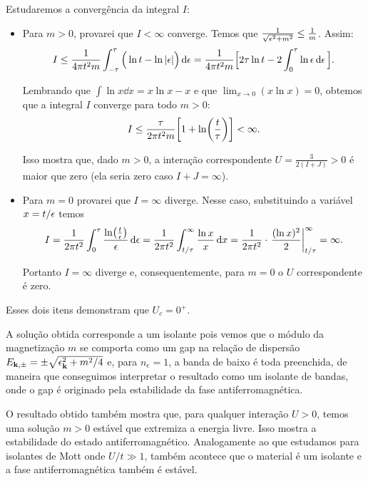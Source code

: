 \documentclass[a4paper,10pt]{article}
\begin{document}
\n

Estudaremos a convergência da integral $I$:
\begin{itemize}
\item Para $m > 0$, provarei que $I < \infty$ converge. Temos que $\frac{1}{\sqrt{\epsilon^2+m^2}} \leq \frac{1}{m}$. Assim:
$$
I \leq \frac{1}{4\pi t^2 m} \int_{-\tau}^{\tau} \Big( \ln t - \ln\abs{\epsilon} \Big) \dd{\epsilon} =
\frac{1}{4\pi t^2 m} \Big[ 2\tau \ln t - 2 \int_{0}^{\tau} \ln\epsilon \dd{\epsilon} \Big] .
$$

Lembrando que $\int \ln x \dd{x} = x \ln x - x$ e que $\displaystyle{\lim_{x\to 0} (x \ln x) = 0}$, obtemos que a integral $I$ converge para todo $m > 0$:
$$
I \leq \frac{\tau}{2\pi t^2 m} \qty[1 + \ln(\frac{t}{\tau})] < \infty.
$$

Isso mostra que, dado $m > 0$, a interação correspondente $U = \frac{3}{2(I+J)} > 0$ é maior que zero (ela seria zero caso $I + J = \infty$).

\item Para $m = 0$ provarei que $I = \infty$ diverge. Nesse caso, substituindo a variável $x = t/\epsilon$ temos
$$
I = \frac{1}{2\pi t^2} \int_{0}^{\tau} \frac{\ln(\frac{t}{\eps})}{\eps} \dd{\eps} =
\frac{1}{2\pi t^2}
\int_{t/\tau}^{\infty} \frac{\ln x}{x} \dd{x} =
\frac{1}{2\pi t^2} \cdot \eval{\frac{(\ln x)^2}{2}}_{t/\tau}^{\infty} = \infty.
$$

Portanto $I = \infty$ diverge e, consequentemente, para $m = 0$ o $U$ correspondente é zero.
\end{itemize}

Esses dois itens demonstram que $U_c = 0^+$.

\n

A solução obtida corresponde a um isolante pois vemos que o módulo da magnetização $m$ se comporta como um gap na relação de dispersão $E_{\vb{k},\pm} = \pm \sqrt{\epsilon_{\vb{k}}^2 + m^2/4}$ e, para $n_e = 1$, a banda de baixo é toda preenchida, de maneira que conseguimos interpretar o resultado como um isolante de bandas, onde o gap é originado pela estabilidade da fase antiferromagnética.

O resultado obtido também mostra que, para qualquer interação $U > 0$, temos uma solução $m > 0$ estável que extremiza a energia livre. Isso mostra a estabilidade do estado antiferromagnético. Analogamente ao que estudamos para isolantes de Mott onde $U/t \gg 1$, também acontece que o material é um isolante e a fase antiferromagnética também é estável.

\pagebreak
\end{document}

